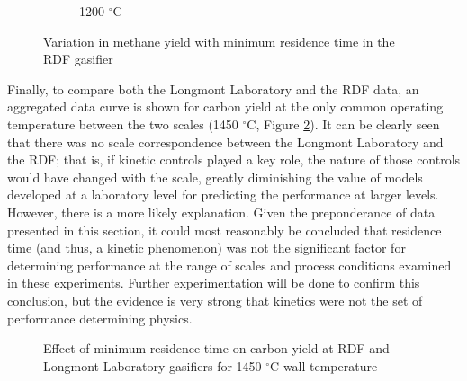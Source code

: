 \documentclass[11pt,twocolumn]{article}
\begin{document}
\begin{figure}
\begin{subfigure}[t]{0.5\textwidth}
		\caption{1200 $^{\circ}$C}	
	\end{subfigure}


\caption{Variation in methane yield with minimum residence time in the RDF gasifier}

\label{fig-RDF-CH4-tmin-temps}
\end{figure}



Finally, to compare both the Longmont Laboratory and the RDF data, an aggregated data curve is shown for carbon yield at the only common operating temperature between the two scales (1450 $^{\circ}$C, Figure \ref{fig-Agg-Xg-tmin-1450}).  It can be clearly seen that there was no scale correspondence between the Longmont Laboratory and the RDF; that is, if kinetic controls played a key role, the nature of those controls would have changed with the scale, greatly diminishing the value of models developed at a laboratory level for predicting the performance at larger levels.  However, there is a more likely explanation.  Given the preponderance of data presented in this section, it could most reasonably be concluded that residence time (and thus, a kinetic phenomenon) was not the significant factor for determining performance at the range of scales and process conditions examined in these experiments.  Further experimentation will be done to confirm this conclusion, but the evidence is very strong that kinetics were not the set of performance determining physics.

\begin{figure}[hp]

\caption{Effect of minimum residence time on carbon yield at RDF and Longmont Laboratory gasifiers for 1450 $^{\circ}$C wall temperature}
\label{fig-Agg-Xg-tmin-1450}
\end{figure}
\end{document}
